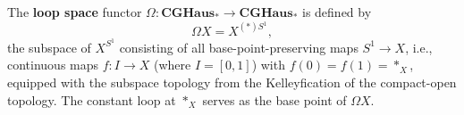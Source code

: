 The \textbf{loop space} functor $\Omega: \mathbf{CGHaus}_* \to \mathbf{CGHaus}_*$ is defined by
$$\Omega X = X^{(*)S^1},$$
the subspace of $X^{S^1}$ consisting of all base-point-preserving maps $S^1 \to X$, i.e., continuous maps $f: I \to X$ (where $I = [0,1]$) with $f(0) = f(1) = *_X$, equipped with the subspace topology from the Kelleyfication of the compact-open topology. The constant loop at $*_X$ serves as the base point of $\Omega X$.
